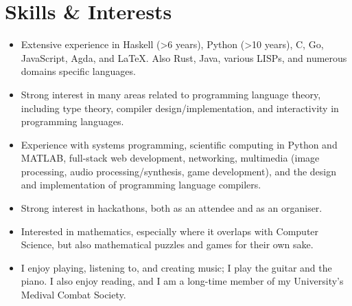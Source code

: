\documentclass[12pt]{article}
\begin{document}
\section*{Skills \& Interests}
\begin{itemize}
	\item Extensive experience in Haskell (>6 years), Python (>10 years), C, Go, JavaScript, Agda, and \LaTeX. Also Rust, Java, various LISPs, and numerous domains specific languages.
	\item Strong interest in many areas related to programming language theory, including type theory, compiler design/implementation, and interactivity in programming languages.
	\item Experience with systems programming, scientific computing in Python and MATLAB, full-stack web development, networking, multimedia (image processing, audio processing/synthesis, game development), and the design and implementation of programming language compilers.
	\item Strong interest in hackathons, both as an attendee and as an organiser.
	\item Interested in mathematics, especially where it overlaps with Computer Science, but also mathematical puzzles and games for their own sake.
	\item I enjoy playing, listening to, and creating music; I play the guitar and the piano. I also enjoy reading, and I am a long-time member of my University's Medival Combat Society.
\end{itemize}
\end{document}
